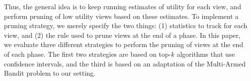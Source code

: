 Thus, the general idea is to keep running estimates of utility for each view, and
perform pruning of low utility views based on these estimates.
To implement a pruning strategy, we merely specify the two things: (1)
statistics to track for each view, and 
(2) the rule used to prune views at the end of a phase.
In this paper, we evaluate three different strategies
to perform the pruning of views at the end of each phase. The first two
strategies are based on top-$k$ algorithms that use confidence intervals, and
the third is based on an adaptation of the Multi-Armed Bandit problem to our
setting.
% 


